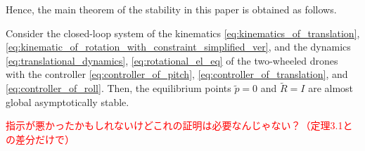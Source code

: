 Hence, the main theorem of the stability in this paper is obtained as follows.
\begin{theorem}
    Consider the closed-loop system of the kinematics \eqref{eq:kinematics_of_translation}, \eqref{eq:kinematic_of_rotation_with_constraint_simplified_ver}, and the dynamics \eqref{eq:translational_dynamics}, \eqref{eq:rotational_el_eq} of the two-wheeled drones with the controller \eqref{eq:controller_of_pitch}, \eqref{eq:controller_of_translation}, and \eqref{eq:controller_of_roll}.
    Then, the equilibrium points $ \tilde{p} = 0 $ and $ \tilde{R} = I $ are almost global asymptotically stable.
\end{theorem}
\textcolor{red}{指示が悪かったかもしれないけどこれの証明は必要なんじゃない？（定理3.1との差分だけで）}
